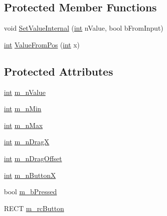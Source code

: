 \subsection*{Protected Member Functions}
\begin{DoxyCompactItemize}
\item 
void \hyperlink{class_c_d_x_u_t_slider_ab345296137df0bba5b421c5f0e58ca8e}{SetValueInternal} (\hyperlink{_d_x_u_tgui_8cpp_a2d77ed03302b6978834ee3b6f57837fb}{int} nValue, bool bFromInput)
\item 
\hyperlink{_d_x_u_tgui_8cpp_a2d77ed03302b6978834ee3b6f57837fb}{int} \hyperlink{class_c_d_x_u_t_slider_a9f7de7328ec31bd8a34bc1873f5acdb3}{ValueFromPos} (\hyperlink{_d_x_u_tgui_8cpp_a2d77ed03302b6978834ee3b6f57837fb}{int} x)
\end{DoxyCompactItemize}
\subsection*{Protected Attributes}
\begin{DoxyCompactItemize}
\item 
\hyperlink{_d_x_u_tgui_8cpp_a2d77ed03302b6978834ee3b6f57837fb}{int} \hyperlink{class_c_d_x_u_t_slider_a2a6bf8157dfbd5edd87dcb192843fba6}{m\_\-nValue}
\item 
\hyperlink{_d_x_u_tgui_8cpp_a2d77ed03302b6978834ee3b6f57837fb}{int} \hyperlink{class_c_d_x_u_t_slider_a87ffaf1be6e79d1a653b9a975d46e789}{m\_\-nMin}
\item 
\hyperlink{_d_x_u_tgui_8cpp_a2d77ed03302b6978834ee3b6f57837fb}{int} \hyperlink{class_c_d_x_u_t_slider_a9d298ae750ce680598ec967af330e20e}{m\_\-nMax}
\item 
\hyperlink{_d_x_u_tgui_8cpp_a2d77ed03302b6978834ee3b6f57837fb}{int} \hyperlink{class_c_d_x_u_t_slider_a302ac014d55da16123986f808cc1ce9b}{m\_\-nDragX}
\item 
\hyperlink{_d_x_u_tgui_8cpp_a2d77ed03302b6978834ee3b6f57837fb}{int} \hyperlink{class_c_d_x_u_t_slider_ae051d327e77fc42a5be5d21576d81993}{m\_\-nDragOffset}
\item 
\hyperlink{_d_x_u_tgui_8cpp_a2d77ed03302b6978834ee3b6f57837fb}{int} \hyperlink{class_c_d_x_u_t_slider_aa6b6822fb10e3294c1880113e486416b}{m\_\-nButtonX}
\item 
bool \hyperlink{class_c_d_x_u_t_slider_a6060a106657615230e6b2cc51f7279ec}{m\_\-bPressed}
\item 
RECT \hyperlink{class_c_d_x_u_t_slider_a0b2ef9570791f34e0c0ba99eeda6adba}{m\_\-rcButton}
\end{DoxyCompactItemize}


